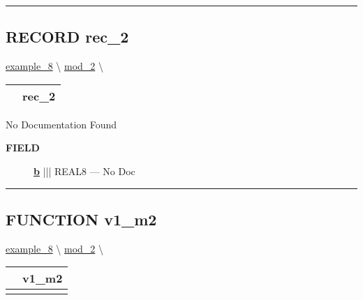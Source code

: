 \rule{\linewidth}{0.5pt}
\subsection*{\textsf{\colorbox{headtoc}{\color{white} RECORD}
rec\_2}}

\hypertarget{ecldoc:example_8.mod_2.rec_2}{}
\hspace{0pt} \hyperlink{ecldoc:example_8}{example_8} \textbackslash 
\hspace{0pt} \hyperlink{ecldoc:example_8.mod_2}{mod_2} \textbackslash 

{\renewcommand{\arraystretch}{1.5}
\begin{tabularx}{\textwidth}{|>{\raggedright\arraybackslash}l|X|}
\hline
\hspace{0pt}\mytexttt{\color{red} } & \textbf{rec\_2} \\
\hline
\end{tabularx}
}

\par





No Documentation Found







\par
\begin{description}
\item [\colorbox{tagtype}{\color{white} \textbf{\textsf{FIELD}}}] \textbf{\underline{b}} ||| REAL8 --- No Doc
\end{description}





\rule{\linewidth}{0.5pt}
\subsection*{\textsf{\colorbox{headtoc}{\color{white} FUNCTION}
v1\_m2}}

\hypertarget{ecldoc:example_8.mod_2.v1_m2}{}
\hspace{0pt} \hyperlink{ecldoc:example_8}{example_8} \textbackslash 
\hspace{0pt} \hyperlink{ecldoc:example_8.mod_2}{mod_2} \textbackslash 

{\renewcommand{\arraystretch}{1.5}
\begin{tabularx}{\textwidth}{|>{\raggedright\arraybackslash}l|X|}
\hline
\hspace{0pt}\mytexttt{\color{red} } & \textbf{v1\_m2} \\
\hline
\multicolumn{2}{|>{\raggedright\arraybackslash}X|}{\hspace{0pt}\mytexttt{\color{param} (REAL8 ag\_1)}} \\
\hline
\end{tabularx}
}

